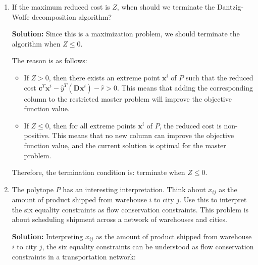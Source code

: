\documentclass[11pt]{article}
\newcommand{\mb}[1]{\ensuremath{\boldsymbol{#1}}}
\begin{document}
\begin{enumerate}
\begin{enumerate}
Therefore, the subproblem can be written explicitly as:
\begin{align*}
Z = \max \quad & x_{11} + x_{22} - 16 \\
\text{s.t.} \quad & x_{11} + x_{12} + x_{13} + x_{14} = 16, \\
                       & x_{21} + x_{22} + x_{23} + x_{24} = 16, \\
                       & x_{11} + x_{21} = 8, \\
                       & x_{12} + x_{22} = 8, \\
                       & x_{13} + x_{23} = 8, \\
                       & x_{14} + x_{24} = 8, \\
                       & x_{ij} \geq 0, \quad \text{for all } i=1,2, \, j=1,2,3,4.
\end{align*} 

\item If the maximum reduced cost is $Z$, when should we terminate the Dantzig-Wolfe decomposition algorithm?

\textbf{Solution:} Since this is a maximization problem, we should terminate the algorithm when $Z \leq 0$.

The reason is as follows:
\begin{itemize}
\item If $Z > 0$, then there exists an extreme point $\mb{x}^i$ of $P$ such that the reduced cost $\mb{c}^T\mb{x}^i - \hat{y}^T(\mb{D}\mb{x}^i) - \hat{r} > 0$. This means that adding the corresponding column to the restricted master problem will improve the objective function value.
\item If $Z \leq 0$, then for all extreme points $\mb{x}^i$ of $P$, the reduced cost is non-positive. This means that no new column can improve the objective function value, and the current solution is optimal for the master problem.
\end{itemize}

Therefore, the termination condition is: terminate when $Z \leq 0$. 



\item The polytope $P$ has an interesting interpretation. Think about $x_{ij}$ as the amount of product shipped from warehouse $i$ to city $j$. Use this to interpret the six equality constraints as flow conservation constraints. This problem is about scheduling shipment across a network of warehouses and cities.

\textbf{Solution:} Interpreting $x_{ij}$ as the amount of product shipped from warehouse $i$ to city $j$, the six equality constraints can be understood as flow conservation constraints in a transportation network:


\end{enumerate}
\end{enumerate}
\end{document}
